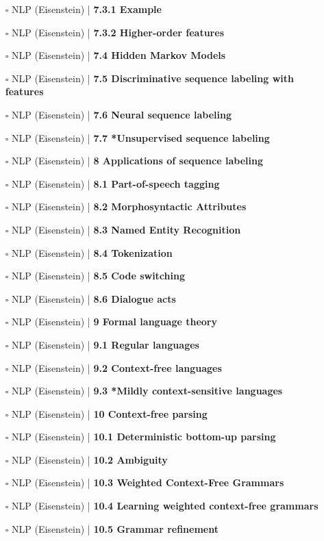 \documentclass[a4, landscape, 12pt]{article}
\newcommand{\checkbox}{$\square$}%
\begin{document}
\begin{itemize}
{}
\item [\checkbox]  NLP (Eisenstein) | \textbf{ 7.3.1 Example
}
\item [\checkbox]  NLP (Eisenstein) | \textbf{ 7.3.2 Higher-order features
}
\item [\checkbox]  NLP (Eisenstein) | \textbf{ 7.4 Hidden Markov Models
}
\item [\checkbox]  NLP (Eisenstein) | \textbf{ 7.5 Discriminative sequence labeling with features
}
\item [\checkbox]  NLP (Eisenstein) | \textbf{ 7.6 Neural sequence labeling
}
\item [\checkbox]  NLP (Eisenstein) | \textbf{ 7.7 *Unsupervised sequence labeling
}
\item [\checkbox]  NLP (Eisenstein) | \textbf{ 8 Applications of sequence labeling
}
\item [\checkbox]  NLP (Eisenstein) | \textbf{ 8.1 Part-of-speech tagging
}
\item [\checkbox]  NLP (Eisenstein) | \textbf{ 8.2 Morphosyntactic Attributes
}
\item [\checkbox]  NLP (Eisenstein) | \textbf{ 8.3 Named Entity Recognition
}
\item [\checkbox]  NLP (Eisenstein) | \textbf{ 8.4 Tokenization
}
\item [\checkbox]  NLP (Eisenstein) | \textbf{ 8.5 Code switching
}
\item [\checkbox]  NLP (Eisenstein) | \textbf{ 8.6 Dialogue acts
}
\item [\checkbox]  NLP (Eisenstein) | \textbf{ 9 Formal language theory
}
\item [\checkbox]  NLP (Eisenstein) | \textbf{ 9.1 Regular languages
}
\item [\checkbox]  NLP (Eisenstein) | \textbf{ 9.2 Context-free languages
}
\item [\checkbox]  NLP (Eisenstein) | \textbf{ 9.3 *Mildly context-sensitive languages
}
\item [\checkbox]  NLP (Eisenstein) | \textbf{ 10 Context-free parsing
}
\item [\checkbox]  NLP (Eisenstein) | \textbf{ 10.1 Deterministic bottom-up parsing
}
\item [\checkbox]  NLP (Eisenstein) | \textbf{ 10.2 Ambiguity
}
\item [\checkbox]  NLP (Eisenstein) | \textbf{ 10.3 Weighted Context-Free Grammars
}
\item [\checkbox]  NLP (Eisenstein) | \textbf{ 10.4 Learning weighted context-free grammars
}
\item [\checkbox]  NLP (Eisenstein) | \textbf{ 10.5 Grammar refinement
}
\end{itemize}
\end{document}
